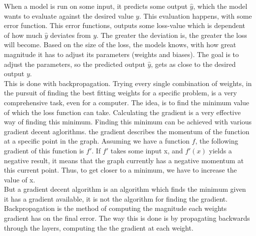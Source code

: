 When a model is run on some input, it predicts some output $\hat{y}$, which the model wants to evaluate against the desired value $y$. This evaluation happens, with some error function. This error functions, outputs some loss-value which is dependent of how much $\hat{y}$ deviates from $y$. The greater the deviation is, the greater the loss will become.
Based on the size of the loss, the models knows, with how great magnitude it has to adjust its parameters (weights and biases). The goal is to adjust the parameters, so the predicted output $\hat{y}$, gets as close to the desired output $y$.\\

\noindent
This is done with backpropagation. Trying every single combination of weights, in the pursuit of finding the best fitting weights for a specific problem, is a very comprehensive task, even for a computer. The idea, is to find the minimum value of which the loss function can take. Calculating the gradient is a very effective way of finding this minimum. Finding this minimum can be achieved with various gradient decent aglorithms. the gradient describes the momentum of the function at a specific point in the graph. Assuming we have a function $f$, the following gradient of this function is $f'$. If $f'$ takes some input x, and $f'(x)$ yields a negative result, it means that the graph currently has a negative momentum at this current point. Thus, to get closer to a minimum, we have to increase the value of x. \\

\noindent
But a gradient decent algorithm is an algorithm which finds the minimum given it has a gradient available, it is not the algorithm for finding the gradient. Backpropagation is the method of computing the magnitude each weights gradient has on the final error. The way this is done is by propagating backwards through the layers, computing the the gradient at each weight.



